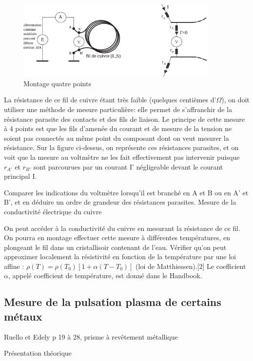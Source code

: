 \documentclass{article}%
\begin{document}
\begin{figure}
	\centerline{\includegraphics[width=10cm]{images-exp/CircuitElecMesure4Points.png}}
	\caption{Montage quatre points}
\end{figure}

La résistance de ce fil de cuivre étant très faible (quelques centièmes d'$\Omega$), on doit utiliser une méthode de mesure particulière: elle permet de s'affranchir de la résistance parasite des contacts et des fils de liaison. Le principe de cette mesure à 4 points est que les fils d'amenée du courant et de mesure de la tension ne soient pas connectés au même point du composant dont on veut mesurer la résistance. Sur la figure ci-dessus, on représente ces résistances parasites, et on voit que la mesure au voltmètre ne les fait effectivement pas intervenir puisque $r_{A'}$ et $r_{B'}$ sont parcourues par un courant I' négligeable devant le courant principal I.

Comparer les indications du voltmètre lorsqu'il est branché en A et B ou en A' et B', et en déduire un ordre de grandeur des résistances parasites.
Mesure de la conductivité électrique du cuivre

On peut accéder à la conductivité du cuivre en mesurant la résistance de ce fil. On pourra en montage effectuer cette mesure à différentes températures, en plongeant le fil dans un cristallisoir contenant de l'eau. Vérifier qu'on peut approximer localement la résistivité en fonction de la température par une loi affine : $\rho(T) = \rho(T_{0}) [1 + \alpha (T-T_{0})]$ (loi de Matthiessen).[2] Le coefficient $\alpha$, appelé coefficient de température, est donné dans le Handbook. 

\subsection{Mesure de la pulsation plasma de certains métaux}
Ruello et Edely p 19 à 28, prisme à revêtement métallique

Présentation théorique
\end{document}
